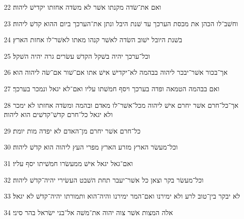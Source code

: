 \par 22 ואם את־שׂדה מקנתו אשׁר לא משׂדה אחזתו יקדישׁ ליהוה׃
\par 23 וחשׁב־לו הכהן את מכסת הערכך עד שׁנת היבל ונתן את־הערכך ביום ההוא קדשׁ ליהוה׃
\par 24 בשׁנת היובל ישׁוב השׂדה לאשׁר קנהו מאתו לאשׁר־לו אחזת הארץ׃
\par 25 וכל־ערכך יהיה בשׁקל הקדשׁ עשׂרים גרה יהיה השׁקל׃
\par 26 אך־בכור אשׁר־יבכר ליהוה בבהמה לא־יקדישׁ אישׁ אתו אם־שׁור אם־שׂה ליהוה הוא׃
\par 27 ואם בבהמה הטמאה ופדה בערכך ויסף חמשׁתו עליו ואם־לא יגאל ונמכר בערכך׃
\par 28 אך־כל־חרם אשׁר יחרם אישׁ ליהוה מכל־אשׁר־לו מאדם ובהמה ומשׂדה אחזתו לא ימכר ולא יגאל כל־חרם קדשׁ־קדשׁים הוא ליהוה׃
\par 29 כל־חרם אשׁר יחרם מן־האדם לא יפדה מות יומת׃
\par 30 וכל־מעשׂר הארץ מזרע הארץ מפרי העץ ליהוה הוא קדשׁ ליהוה׃
\par 31 ואם־גאל יגאל אישׁ ממעשׂרו חמשׁיתו יסף עליו׃
\par 32 וכל־מעשׂר בקר וצאן כל אשׁר־יעבר תחת השׁבט העשׂירי יהיה־קדשׁ ליהוה׃
\par 33 לא יבקר בין־טוב לרע ולא ימירנו ואם־המר ימירנו והיה־הוא ותמורתו יהיה־קדשׁ לא יגאל׃
\par 34 אלה המצות אשׁר צוה יהוה את־משׁה אל־בני ישׂראל בהר סיני׃


